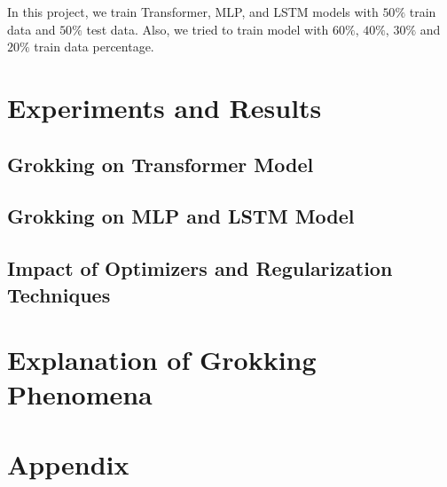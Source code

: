 \documentclass{article}
\begin{document}
In this project, we train Transformer, MLP, and LSTM models with $50\%$ train data and $50\%$ test data. Also, we tried to train model with $60\%$, $40\%$, $30\%$ and $20\%$ train data percentage.

\section{Experiments and Results}

\subsection{Grokking on Transformer Model}

\subsection{Grokking on MLP and LSTM Model}

\subsection{Impact of Optimizers and Regularization Techniques}

\section{Explanation of Grokking Phenomena}

\appendix

\section{Appendix}
\end{document}
